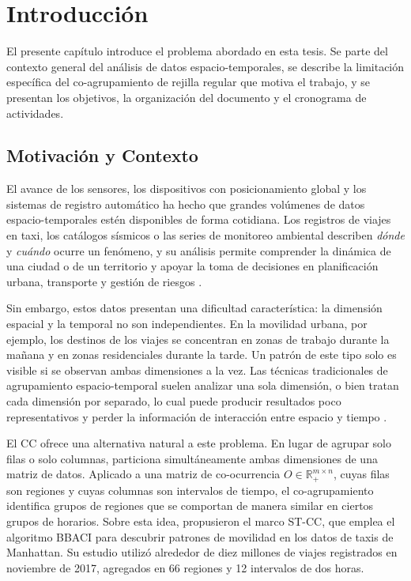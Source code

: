 
\chapter{Introducción}
\label{chap:introduccion}

El presente capítulo introduce el problema abordado en esta tesis. Se parte
del contexto general del análisis de datos espacio-temporales, se describe
la limitación específica del co-agrupamiento de rejilla regular que motiva
el trabajo, y se presentan los objetivos, la organización del documento y
el cronograma de actividades.

\section{Motivación y Contexto}
\label{sec:motivacion}

El avance de los sensores, los dispositivos con posicionamiento global y
los sistemas de registro automático ha hecho que grandes volúmenes de datos
espacio-temporales estén disponibles de forma cotidiana. Los registros de
viajes en taxi, los catálogos sísmicos o las series de monitoreo ambiental
describen \emph{dónde} y \emph{cuándo} ocurre un fenómeno, y su análisis
permite comprender la dinámica de una ciudad o de un territorio y apoyar la
toma de decisiones en planificación urbana, transporte y gestión de riesgos
\cite{Liu2021}.

Sin embargo, estos datos presentan una dificultad característica: la
dimensión espacial y la temporal no son independientes. En la movilidad
urbana, por ejemplo, los destinos de los viajes se concentran en zonas de
trabajo durante la mañana y en zonas residenciales durante la tarde. Un
patrón de este tipo solo es visible si se observan ambas dimensiones a la
vez. Las técnicas tradicionales de agrupamiento espacio-temporal suelen
analizar una sola dimensión, o bien tratan cada dimensión por separado, lo
cual puede producir resultados poco representativos y perder la información
de interacción entre espacio y tiempo \cite{Liu2021}.

El \ac{CC} ofrece una alternativa natural a este problema. En lugar de
agrupar solo filas o solo columnas, particiona simultáneamente ambas
dimensiones de una matriz de datos. Aplicado a una matriz de co-ocurrencia
$O \in \mathbb{R}_{+}^{m \times n}$, cuyas filas son regiones y cuyas
columnas son intervalos de tiempo, el co-agrupamiento identifica grupos de
regiones que se comportan de manera similar en ciertos grupos de horarios.
Sobre esta idea, \cite{Liu2021} propusieron el marco \ac{ST-CC}, que emplea
el algoritmo \ac{BBACI} \cite{Banerjee2007} para descubrir patrones de
movilidad en los datos de taxis de Manhattan. Su estudio utilizó alrededor
de diez millones de viajes registrados en noviembre de 2017, agregados en
66 regiones y 12 intervalos de dos horas.

